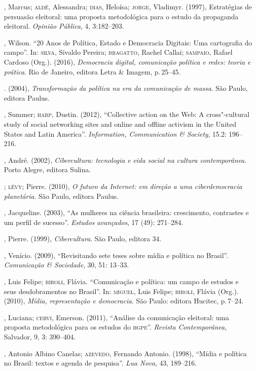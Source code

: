 \begin{bibliohedra}
, Marcus; \textsc{aldé}, Alessandra; \textsc{dias}, Heloísa; \textsc{jorge}, Vladimyr.
(1997), Estratégias de persuasão eleitoral: uma proposta metodológica
para o estudo da propaganda eleitoral. \emph{Opinião Pública}, 4,
3:182--203.

, Wilson. ``20 Anos de Política, Estado e Democracia Digitais: Uma
cartografia do campo''. In: \textsc{silva}, Sivaldo Pereira; \textsc{bragatto}, Rachel
Callai; \textsc{sampaio}, Rafael Cardoso (Org.). (2016), \emph{Democracia
digital, comunicação política e redes: teoria e prática}. Rio
de Janeiro, editora Letra \& Imagem, p.\,25--45.

\titidem. (2004), \emph{Transformação da política na era da
comunicação de massa}. São Paulo, editora Paulus.

, Summer; \textsc{harp}, Dustin. (2012), ``Collective action on the Web: A
cross"-cultural study of social networking sites and online and offline
activism in the United States and Latin America''. \emph{Information,
Communication \& Society}, 15.2: 196--216.

, André. (2002), \emph{Cibercultura: tecnologia e vida social na
cultura contemporânea}. Porto Alegre, editora Sulina.

\titidem; \textsc{lévy}; Pierre. (2010), \emph{O futuro da Internet: em
direção a uma ciberdemocracia planetária}. São Paulo, editora Paulus.

, Jacqueline. (2003), ``As mulheres na ciência brasileira:
crescimento, contrastes e um perfil de sucesso''. \emph{Estudos
avançados}, 17 (49): 271--284.

, Pierre. (1999), \emph{Cibercultura}. São Paulo, editora 34.

, Venício. (2009), ``Revisitando sete teses sobre mídia e política
no Brasil''. \emph{Comunicação \& Sociedade}, 30, 51: 13--33.

, Luis Felipe; \textsc{biroli}, Flávia. ``Comunicação e política: um campo
de estudos e seus desdobramentos no Brasil''. In: \textsc{miguel}, Luis Felipe;
\textsc{biroli}, Flávia (Org.). (2010), \emph{Mídia, representação e democracia}.
São Paulo: editora Hucitec, p.\,7--24.

, Luciana; \textsc{cervi}, Emerson. (2011), ``Análise da comunicação
eleitoral: uma proposta metodológica para os estudos do \textsc{hgpe}''.
\emph{Revista Contemporânea}, Salvador, 9, 3: 390--404.

, Antonio Albino Canelas; \textsc{azevedo}, Fernando Antonio. (1998),
``Mídia e política no Brasil: textos e agenda de pesquisa''. \emph{Lua
Nova}, 43, 189--216.


\end{bibliohedra}
